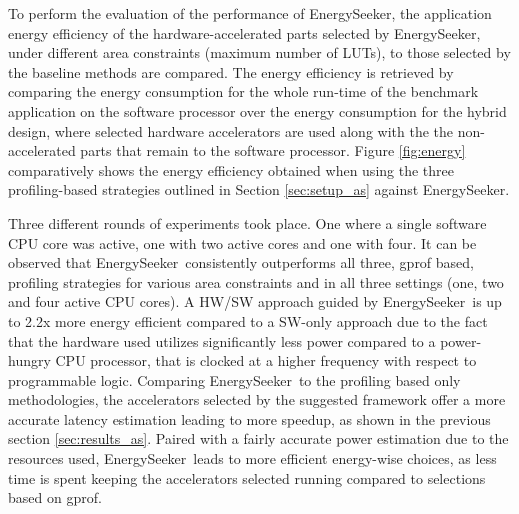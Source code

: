 \documentclass[]{usiinfthesis}
\newcommand{\eseeker}{{EnergySeeker}}
\begin{document}
To perform the evaluation of the performance of \eseeker, the application energy efficiency of the 
hardware-accelerated parts selected by \eseeker, under different area constraints (maximum number of 
LUTs), to those selected by the baseline methods are compared.
The energy efficiency is retrieved by comparing the energy consumption for the whole run-time of the 
benchmark application on the software processor over the energy consumption for the hybrid design, where 
selected hardware accelerators are used along with the the non-accelerated parts that remain to the  
software processor. Figure \ref{fig:energy} comparatively shows the energy efficiency obtained when using 
the three profiling-based strategies outlined in Section \ref{sec:setup_as} against \eseeker.\par

Three different rounds of experiments took place. One where a single software CPU core was active, one
with two active cores and one with four. It can be observed that \eseeker\ consistently outperforms all
three, gprof based, profiling strategies for various area constraints and in all three settings (one, two 
and four active CPU cores). A HW/SW approach guided by \eseeker\ is up to 2.2x more energy efficient compared to 
a SW-only approach due to the fact that the hardware used utilizes significantly less power compared to a power-hungry 
CPU processor, that is clocked at a higher frequency with respect to programmable logic. Comparing \eseeker\ to the profiling based only methodologies, the accelerators selected by
the suggested framework offer a more accurate latency estimation leading to more speedup, as shown in the previous section \ref{sec:results_as}. Paired with a fairly accurate power estimation due to the resources used, \eseeker\ 
leads to more efficient energy-wise choices, as less time is spent keeping the accelerators selected running compared
to selections based on gprof.
\end{document}
